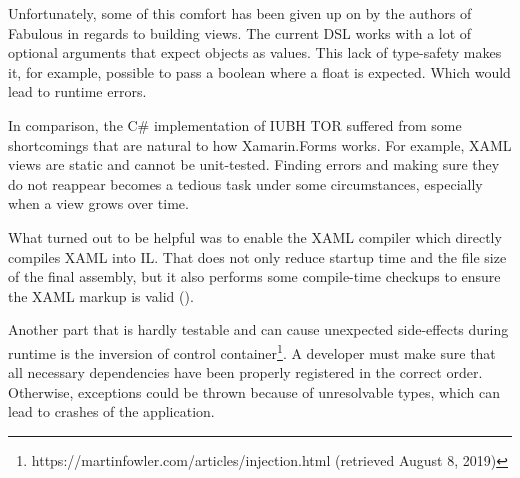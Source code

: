 Unfortunately, some of this comfort has been given up on by the authors of Fabulous in regards to building views. The current DSL works with a lot of optional arguments that expect objects as values. This lack of type-safety makes it, for example, possible to pass a boolean where a float is expected. Which would lead to runtime errors.

In comparison, the C\# implementation of IUBH TOR suffered from some shortcomings that are natural to how Xamarin.Forms works. For example, XAML views are static and cannot be unit-tested. Finding errors and making sure they do not reappear becomes a tedious task under some circumstances, especially when a view grows over time. 

What turned out to be helpful was to enable the XAML compiler which directly compiles XAML into IL. That does not only reduce startup time and the file size of the final assembly, but it also performs some compile-time checkups to ensure the XAML markup is valid (\cite{microsoft_xaml_2018}).

Another part that is hardly testable and can cause unexpected side-effects during runtime is the inversion of control container\footnote{https://martinfowler.com/articles/injection.html (retrieved August 8, 2019)}. A developer must make sure that all necessary dependencies have been properly registered in the correct order. Otherwise, exceptions could be thrown because of unresolvable types, which can lead to crashes of the application.
